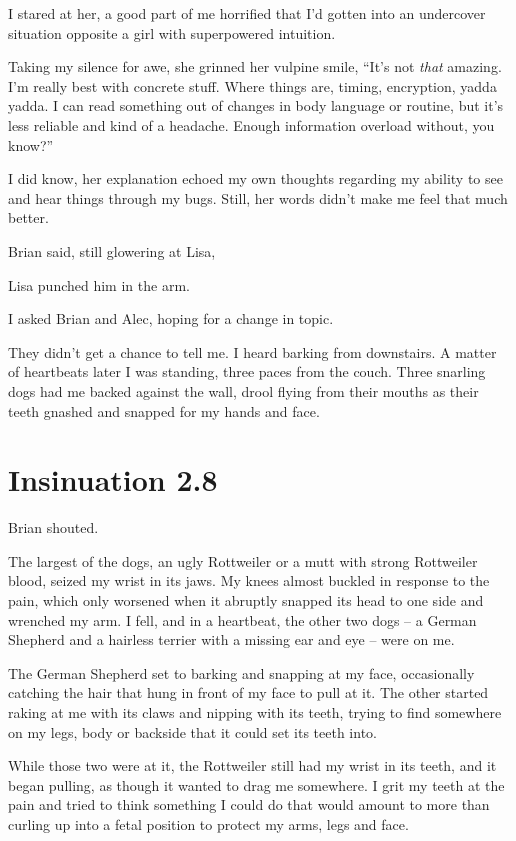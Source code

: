 I stared at her, a good part of me horrified that I'd gotten into an undercover situation opposite a girl with superpowered intuition.

Taking my silence for awe, she grinned her vulpine smile, “It's not {\em that} amazing. I'm really best with concrete stuff. Where things are, timing, encryption, yadda yadda. I can read something out of changes in body language or routine, but it's less reliable and kind of a headache. Enough information overload without, you know?”

I did know, her explanation echoed my own thoughts regarding my ability to see and hear things through my bugs. Still, her words didn't make me feel that much better.

 Brian said, still glowering at Lisa, 

Lisa punched him in the arm.

 I asked Brian and Alec, hoping for a change in topic.

They didn't get a chance to tell me. I heard barking from downstairs. A matter of heartbeats later I was standing, three paces from the couch. Three snarling dogs had me backed against the wall, drool flying from their mouths as their teeth gnashed and snapped for my hands and face.


\chapter{Insinuation 2.8}

 Brian shouted.

The largest of the dogs, an ugly Rottweiler or a mutt with strong Rottweiler blood, seized my wrist in its jaws. My knees almost buckled in response to the pain, which only worsened when it abruptly snapped its head to one side and wrenched my arm. I fell, and in a heartbeat, the other two dogs -- a German Shepherd and a hairless terrier with a missing ear and eye -- were on me.

The German Shepherd set to barking and snapping at my face, occasionally catching the hair that hung in front of my face to pull at it. The other started raking at me with its claws and nipping with its teeth, trying to find somewhere on my legs, body or backside that it could set its teeth into.

While those two were at it, the Rottweiler still had my wrist in its teeth, and it began pulling, as though it wanted to drag me somewhere. I grit my teeth at the pain and tried to think something I could do that would amount to more than curling up into a fetal position to protect my arms, legs and face.

